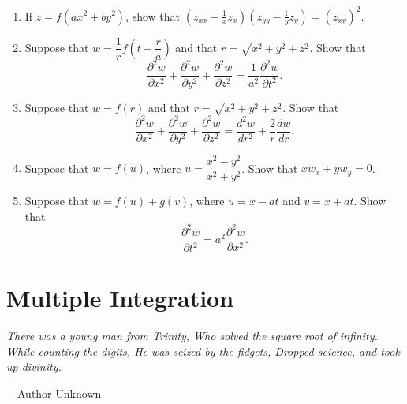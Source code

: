 \documentclass[titlepage,a4paper,12pt]{report}
\begin{document}
\begin{enumerate}
 \item If $z=f(ax^2+by^2)$, show that $(z_{xx}-\frac{1}{x}z_x)(z_{yy}-\frac{1}{y}z_y)=(z_{xy})^2$.
  \item Suppose that $w=\dfrac{1}{r}f\left(t-\dfrac{r}{a}\right)$ and that $r=\sqrt{x^2+y^2+z^2}$. Show that \[\dfrac{\partial ^2 w}{\partial x^2}+\dfrac{\partial ^2 w}{\partial y^2}+\dfrac{\partial ^2 w}{\partial z^2}=\dfrac{1}{a^2}\dfrac{\partial ^2w}{\partial t^2}.\]
  \item Suppose that $w=f(r)$ and that $r=\sqrt{x^2+y^2+z^2}$. Show that \[\dfrac{\partial ^2 w}{\partial x^2}+\dfrac{\partial ^2 w}{\partial y^2}+\dfrac{\partial ^2 w}{\partial z^2}=\dfrac{d^2 w}{dr^2}+\dfrac{2}{r}\dfrac{dw}{dr}.\]
  \item Suppose that $w=f(u)$, where $u=\dfrac{x^2-y^2}{x^2+y^2}$. Show that $xw_x+yw_y=0$.
  \item Suppose that $w=f(u)+g(v)$, where $u=x-at$ and $v=x+at$. Show that 
  \[\dfrac{\partial ^2w }{\partial t^2}=a^2\dfrac{\partial ^2 w}{\partial x^2}.\]
 \end{enumerate}
\chapter{Multiple Integration}
\begin{center}
\small{\parbox{18cm}{
		\begin{raggedright}
		{\small
		\textit{There was a young man from Trinity,
Who solved the square root of infinity.
While counting the digits,
He was seized by the fidgets,
Dropped science, and took up divinity.}
 }
 
				\vspace{.5cm}\hfill{---Author Unknown}
		\end{raggedright}
	}
} 
\end{center}
\end{document}
